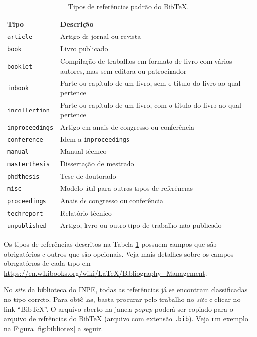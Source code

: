 \begin{table}[H]
\centering
\caption{Tipos de referências padrão do Bib\TeX{}.}
\label{tab:refs}
    \begin{tabular}{p{4cm}p{9cm}}
    \toprule
    \textbf{Tipo} & \textbf{Descrição} \\
    \midrule
    {\tt article}       & Artigo de jornal ou revista \\
    {\tt book}          & Livro publicado \\
    {\tt booklet}       & Compilação de trabalhos em formato de livro com vários autores, mas sem editora ou patrocinador \\
    {\tt inbook}        & Parte ou capítulo de um livro, sem o título do livro ao qual pertence \\
    {\tt incollection}  & Parte ou capítulo de um livro, com o título do livro ao qual pertence \\
    {\tt inproceedings} & Artigo em anais de congresso ou conferência \\
    {\tt conference}    & Idem a {\tt inproceedings} \\
    {\tt manual}        & Manual técnico \\
    {\tt masterthesis}  & Dissertação de mestrado \\
    {\tt phdthesis}     & Tese de doutorado \\
    {\tt misc}          & Modelo útil para outros tipos de referências \\
    {\tt proceedings}   & Anais de congresso ou conferência \\
    {\tt techreport}    & Relatório técnico \\
    {\tt unpublished}   & Artigo, livro ou outro tipo de trabalho não publicado \\
    \bottomrule
    \end{tabular}
\end{table}

\begin{marker}
Os tipos de referências descritos na Tabela \ref{tab:refs} possuem campos que são obrigatórios e outros que são opcionais. Veja mais detalhes sobre os campos obrigatórios de cada tipo em \url{https://en.wikibooks.org/wiki/LaTeX/Bibliography_Management}.
\end{marker}

No \textit{site} da biblioteca do INPE, todas as referências já se encontram classificadas no tipo correto. Para obtê-las, basta procurar pelo trabalho no \textit{site} e clicar no link ``Bib\TeX{}''. O arquivo aberto na janela \textit{popup} poderá ser copiado para o arquivo de refrências do Bib\TeX{} (arquivo com extensão {\tt .bib}). Veja um exemplo na Figura \ref{fig:bibliotex} a seguir.

